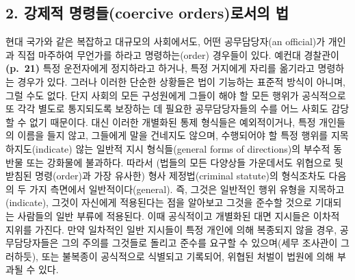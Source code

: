 \subsection{2. 강제적 명령들(coercive orders)로서의
법}\label{uxac15uxc81cuxc801-uxba85uxb839uxb4e4coercive-ordersuxb85cuxc11cuxc758-uxbc95}

현대 국가와 같은 복잡하고 대규모의 사회에서도, 어떤 공무담당자(an
official)가 개인과 직접 마주하여 무언가를 하라고 명령하는(order)
경우들이 있다. 예컨대 경찰관이 \textbf{(p.~21)} 특정 운전자에게
정지하라고 하거나, 특정 거지에게 자리를 옮기라고 명령하는 경우가 있다.
그러나 이러한 단순한 상황들은 법이 기능하는 표준적 방식이 아니며, 그럴
수도 없다. 단지 사회의 모든 구성원에게 그들이 해야 할 모든 행위가
공식적으로 또 각각 별도로 통지되도록 보장하는 데 필요한 공무담당자들의
수를 어느 사회도 감당할 수 없기 때문이다. 대신 이러한 개별화된 통제
형식들은 예외적이거나, 특정 개인들의 이름을 들지 않고, 그들에게 말을
건네지도 않으며, 수행되어야 할 특정 행위를 지목하지도(indicate) 않는
일반적 지시 형식들(general forms of directions)의 부수적 동반물 또는
강화물에 불과하다. 따라서 (법들의 모든 다양상들 가운데서도 위협으로
뒷받침된 명령(order)과 가장 유사한) 형사 제정법(criminal statute)의
 형식조차도 다음의 두 가지 측면에서
일반적이다(general). 즉, 그것은 일반적인 행위 유형을 지목하고(indicate),
그것이 자신에게 적용된다는 점을 알아보고 그것을 준수할 것으로 기대되는
사람들의 일반 부류에 적용된다. 이때 공식적이고 개별화된 대면 지시들은
이차적 지위를 가진다. 만약 일차적인 일반 지시들이 특정 개인에 의해
복종되지 않을 경우, 공무담당자들은 그의 주의를 그것들로 돌리고 준수를
요구할 수 있으며(세무 조사관이 그러하듯), 또는 불복종이 공식적으로
식별되고 기록되어, 위협된 처벌이 법원에 의해 부과될 수 있다.

